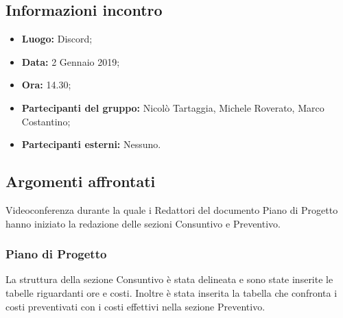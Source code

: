 \subsection{Informazioni incontro}
\begin{itemize}
	\item { \textbf{Luogo:} Discord;  }
	\item { \textbf{Data:} 2 Gennaio 2019; }
	\item { \textbf{Ora:} 14.30; }
	\item { \textbf{Partecipanti del gruppo:} Nicolò Tartaggia, Michele Roverato, Marco Costantino;}
	\item { \textbf{Partecipanti esterni:} Nessuno. }
\end{itemize}


\subsection{Argomenti affrontati}
Videoconferenza durante la quale i Redattori del documento Piano di Progetto hanno iniziato la redazione delle sezioni Consuntivo e Preventivo.

\subsubsection{Piano di Progetto}
La struttura della sezione Consuntivo è stata delineata e sono state inserite le tabelle riguardanti ore e costi. Inoltre è stata inserita la tabella che confronta i costi preventivati con i costi effettivi nella sezione Preventivo.